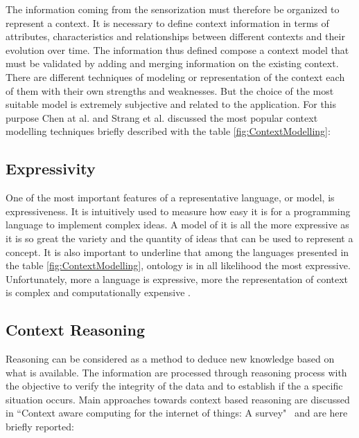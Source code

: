 \documentclass{thesisreport}
\begin{document}
The information coming from the sensorization must therefore be organized to represent a context. 
It is necessary to define context information in terms of attributes, characteristics and relationships between different contexts and their evolution over time. The information thus defined compose a context model that must be validated by adding and merging information on the existing context.
There are different techniques of modeling or representation of the context each of them with their own strengths and weaknesses. But the choice of the most suitable model is extremely subjective and related to the application. For this purpose Chen at al. \cite{chen2000survey} and Strang et al. \cite{strang2004context} discussed the most popular context modelling techniques briefly described with the table  \ref{fig:ContextModelling}:
\vspace{0.2 cm}
	


\subsection{Expressivity}

One of the most important features of a representative language, or model, is expressiveness. It is intuitively used to measure how easy it is for a programming language to implement complex ideas. A model of it is all the more expressive as it is so great the variety and the quantity of ideas that can be used to represent a concept.
It is also important to underline that among the languages presented in the table \ref{fig:ContextModelling}, ontology is in all likelihood the most expressive. Unfortunately, more a language is expressive, more the representation of context is complex and computationally expensive \cite{farmer2007chiron}.

 \subsection{Context Reasoning}
 
 Reasoning can be considered as a method to deduce new knowledge based on what is available.  
 The information are processed through reasoning process with the objective to verify the integrity of the data and to establish if the a specific situation occurs. Main approaches towards context based reasoning are discussed in ``Context aware computing for the internet of things:  A survey"~\cite{perera2014context} and are here briefly reported:
 
\end{document}
